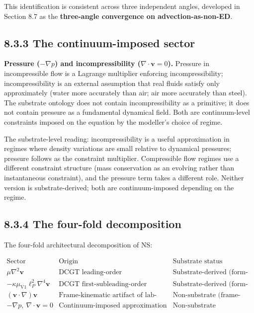 \documentclass[11pt]{book}
\begin{document}
This identification is consistent across three independent angles, developed in Section 8.7 as the \textbf{three-angle convergence on advection-as-non-ED}.

\subsection{8.3.3 The continuum-imposed sector}

\textbf{Pressure ($-\nabla p$) and incompressibility ($\nabla\cdot\mathbf{v} = 0$).} Pressure in incompressible flow is a Lagrange multiplier enforcing incompressibility; incompressibility is an external assumption that real fluids satisfy only approximately (water more accurately than air; air more accurately than steel). The substrate ontology does not contain incompressibility as a primitive; it does not contain pressure as a fundamental dynamical field. Both are continuum-level constraints imposed on the equation by the modeller's choice of regime.

The substrate-level reading: incompressibility is a useful approximation in regimes where density variations are small relative to dynamical pressures; pressure follows as the constraint multiplier. Compressible flow regimes use a different constraint structure (mass conservation as an evolving rather than instantaneous constraint), and the pressure term takes a different role. Neither version is substrate-derived; both are continuum-imposed depending on the regime.

\subsection{8.3.4 The four-fold decomposition}

The four-fold architectural decomposition of NS:

\[
\begin{array}{l|l|l}
\text{Sector} & \text{Origin} & \text{Substrate status} \\
\hline
\mu\nabla^2\mathbf{v} & \text{DCGT leading-order} & \text{Substrate-derived (form-FORCED)} \\
-\kappa\mu_{\mathrm{V1}}\ell_P^2\nabla^4\mathbf{v} & \text{DCGT first-subleading-order} & \text{Substrate-derived (form-FORCED)} \\
(\mathbf{v}\cdot\nabla)\mathbf{v} & \text{Frame-kinematic artifact of lab-frame coordinates} & \text{Non-substrate (frame-kinematic)} \\
-\nabla p,\ \nabla\cdot\mathbf{v}=0 & \text{Continuum-imposed approximation} & \text{Non-substrate (constraint-class)} \\
\end{array}
\]
\end{document}
